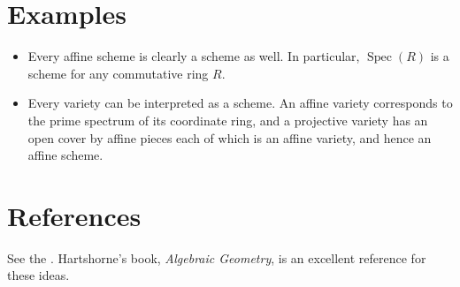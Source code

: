 \documentclass[12pt]{article}
\newcommand{\Spec}{\operatorname{Spec}}
\begin{document}
\section{Examples}

\begin{itemize}
\item Every affine scheme is clearly a scheme as well. In particular, $\Spec(R)$ is a scheme for any commutative ring $R$.
\item Every variety can be interpreted as a scheme. An affine variety corresponds to the prime spectrum of its coordinate ring, and a projective variety has an open cover by affine pieces each of which is an affine variety, and hence an affine scheme.
\end{itemize}

\section{References}

See the .  Hartshorne's book, \emph{Algebraic Geometry}, is an excellent reference for these ideas.
\end{document}
